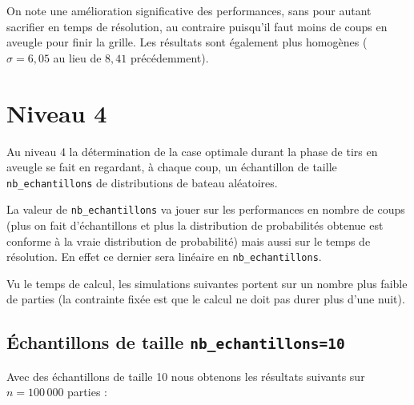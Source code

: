 On note une amélioration significative des performances, sans pour autant sacrifier en temps de résolution, au contraire puisqu'il faut moins de coups en aveugle pour finir la grille. Les résultats sont également plus homogènes ($\sigma=6,05$ au lieu de $8,41$ précédemment).

\newpage
\section{Niveau 4}
Au niveau 4 la détermination de la case optimale durant la phase de tirs en aveugle se fait en regardant, à chaque coup, un échantillon de taille \texttt{nb\_echantillons} de distributions de bateau aléatoires.

La valeur de \texttt{nb\_echantillons} va jouer sur les performances en nombre de coups (plus on fait d'échantillons et plus la distribution de probabilités obtenue est conforme à la vraie distribution de probabilité) mais aussi sur le temps de résolution. En effet ce dernier sera linéaire en \texttt{nb\_echantillons}.

Vu le temps de calcul, les simulations suivantes portent sur un nombre plus faible de parties (la contrainte fixée est que le calcul ne doit pas durer plus d'une nuit).
\subsection{Échantillons de taille \texttt{nb\_echantillons=10}}
Avec des échantillons de taille 10 nous obtenons les résultats suivants sur $n=100\,000$ parties :

\begin{center}
\end{center}

